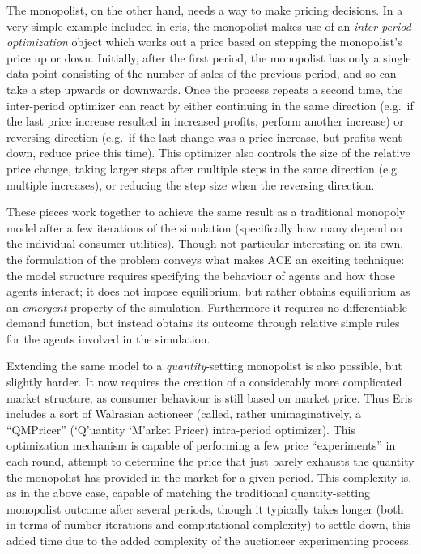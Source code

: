 \documentclass[12pt]{article}
\numberwithin{equation}{subsection}
\begin{document}
The monopolist, on the other hand, needs a way to make pricing decisions.  In a very simple example
included in eris, the monopolist makes use of an \emph{inter-period optimization} object which works
out a price based on stepping the monopolist's price up or down.  Initially, after the first period,
the monopolist has only a single data point consisting of the number of sales of the previous
period, and so can take a step upwards or downwards.  Once the process repeats a second time, the
inter-period optimizer can react by either continuing in the same direction (e.g.\ if the last
price increase resulted in increased profits, perform another increase) or reversing direction
(e.g.\ if the last change was a price increase, but profits went down, reduce price this time).
This optimizer also controls the size of the relative price change, taking larger steps after
multiple steps in the same direction (e.g. multiple increases), or reducing the step size when the
reversing direction.

These pieces work together to achieve the same result as a traditional monopoly model after a few
iterations of the simulation (specifically how many depend on the individual consumer utilities).
Though not particular interesting on its own, the formulation of the problem conveys what makes ACE
an exciting technique: the model structure requires specifying the behaviour of agents and how those
agents interact; it does not impose equilibrium, but rather obtains equilibrium as an
\emph{emergent} property of the simulation.  Furthermore it requires no differentiable demand
function, but instead obtains its outcome through relative simple rules for the agents involved in
the simulation.

Extending the same model to a \emph{quantity}-setting monopolist is also possible, but slightly
harder.  It now requires the creation of a considerably more complicated market structure, as
consumer behaviour is still based on market price.  Thus Eris includes a sort of Walrasian actioneer
(called, rather unimaginatively, a ``QMPricer'' (`Q'uantity `M'arket Pricer) intra-period
optimizer).  This optimization mechanism is capable of performing a few price ``experiments'' in
each round, attempt to determine the price that just barely exhausts the quantity the monopolist has
provided in the market for a given period.  This complexity is, as in the above case, capable of
matching the traditional quantity-setting monopolist outcome after several periods, though it
typically takes longer (both in terms of number iterations and computational complexity) to settle
down, this added time due to the added complexity of the auctioneer experimenting process.
\end{document}
